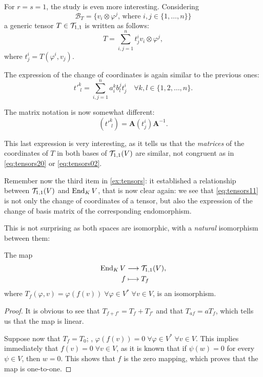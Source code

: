 For $r = s = 1$, the study is even more interesting. Considering
\[
	\mathcal{B}_T = \{v_i \otimes \varphi^j \textrm{, where } i,j \in \{1,\dots,n\}\}
\]
a generic tensor $T\in{\mathcal T}_{1,1}$ is written as follows:
\[
T = \sum_{i,j=1}^n t^i_j v_i \otimes \varphi^j,
\]
where $t^i_j = T(\varphi^i, v_j)$.

The expression of the change of coordinates is again similar to the previous ones:
\[
	t'^k_{\phantom{'}l} = \sum_{i,j = 1}^n a^k_i b_l^j  t^i_j \quad \forall k,l \in \{1,2,\dots,n\}.
\]

The matrix notation is now somewhat different:
\begin{equation}
	\label{eq:tensors11}
	(t'^k_{\phantom{'}l}) = \mathbf{A} (t^i_j) \mathbf{A}^{-1}.
\end{equation}

This last expression is very interesting, as it tells us that the \emph{matrices} of the coordinates of $T$ in both bases of ${\mathcal T}_{1,1}(V)$ are similar, not congruent as in \autoref{eq:tensors20} or \autoref{eq:tensors02}.

Remember now the third item in \autoref{ex:tensors}: it established a relationship between ${\mathcal T}_{1,1}(V)$ and $\operatorname{End}_K V$, that is now clear again: we see that \autoref{eq:tensors11} is not only the change of coordinates of a tensor, but also the expression of the change of basis matrix of the corresponding endomorphism.

This is not surprising as both spaces are isomorphic, with a \emph{natural} isomorphism between them:
\begin{theorem}
	The map
	\begin{align*}
		\operatorname{End}_K V &\longrightarrow {\mathcal T}_{1,1}(V),\\
		f &\longmapsto T_f
	\end{align*}
	where $T_f(\varphi, v) = \varphi(f(v)) \; \forall \varphi \in V^* \; \forall v \in V$, is an isomorphism.
\end{theorem}
\begin{proof}
	It is obvious to see that $T_{f+f'} = T_f +T_{f'}$ and that $T_{af} = aT_f$, which tells us that the map is linear.

	Suppose now that $T_f = T_0$; \ie, $\varphi(f(v)) = 0 \; \forall \varphi \in V^* \; \forall v \in V$. This implies immediately that $f(v) = 0 \; \forall v \in V$, as it is known that if $\psi(w) = 0$ for every $\psi \in V$, then $w = 0$. This shows that $f$ is the zero mapping, which proves that the map is one-to-one.
\end{proof}

